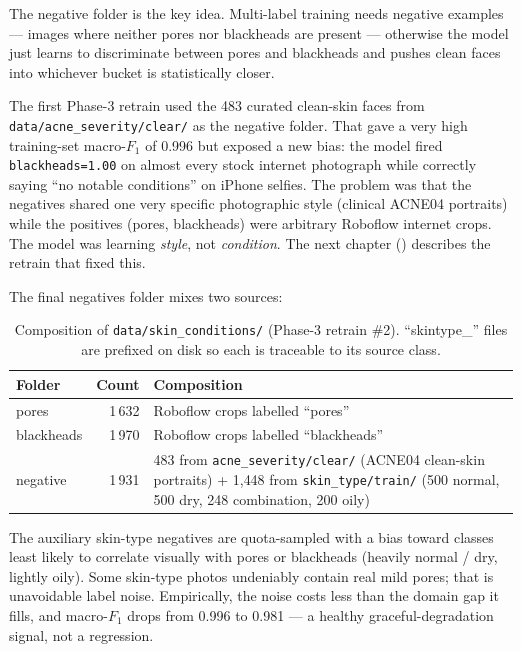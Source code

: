 \documentclass[11pt,a4paper,oneside]{report}
\begin{document}
The negative folder is the key idea. Multi-label training needs
negative examples --- images where neither pores nor blackheads are
present --- otherwise the model just learns to discriminate between
pores and blackheads and pushes clean faces into whichever bucket is
statistically closer.

The first Phase-3 retrain used the 483 curated clean-skin faces from
\texttt{data/acne\_severity/clear/} as the negative folder. That
gave a very high training-set macro-\(F_1\) of 0.996 but exposed a
new bias: the model fired \texttt{blackheads=1.00} on almost every
stock internet photograph while correctly saying ``no notable
conditions'' on iPhone selfies. The problem was that the negatives
shared one very specific photographic style (clinical ACNE04
portraits) while the positives (pores, blackheads) were arbitrary
Roboflow internet crops. The model was learning \emph{style}, not
\emph{condition}. The next chapter ()
describes the retrain that fixed this.

The final negatives folder mixes two sources:

\begin{table}[htbp]
    \centering
    \caption{Composition of \texttt{data/skin\_conditions/} (Phase-3
    retrain \#2). ``skintype\_'' files are prefixed on disk so each
    is traceable to its source class.}
    \label{tab:conditions-dataset}
    \small
    \begin{tabularx}{\linewidth}{lrX}
        \toprule
        \textbf{Folder} & \textbf{Count} & \textbf{Composition} \\
        \midrule
        pores       & 1\,632 & Roboflow crops labelled ``pores'' \\
        blackheads  & 1\,970 & Roboflow crops labelled ``blackheads'' \\
        negative    & 1\,931 & 483 from \texttt{acne\_severity/clear/} (ACNE04
                                clean-skin portraits) + 1{,}448 from
                                \texttt{skin\_type/train/} (500 normal,
                                500 dry, 248 combination, 200 oily) \\
        \bottomrule
    \end{tabularx}
\end{table}

The auxiliary skin-type negatives are quota-sampled with a bias
toward classes least likely to correlate visually with pores or
blackheads (heavily normal / dry, lightly oily). Some skin-type
photos undeniably contain real mild pores; that is unavoidable
label noise. Empirically, the noise costs less than the domain gap
it fills, and macro-\(F_1\) drops from 0.996 to 0.981 --- a healthy
graceful-degradation signal, not a regression.
\end{document}
